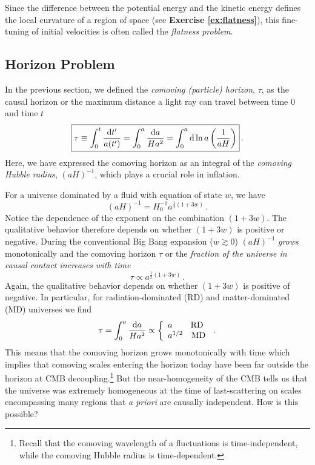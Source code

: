 \documentclass[12pt,letterpaper,rotate]{article}
\def\beq{\begin{equation}}
\def\eeq{\end{equation}}
\def\d{{\rm d}}
\begin{document}
{\begin{itemize}
Since the difference between the potential energy and the kinetic energy defines the local curvature of a region of space (see {\bf Exercise \ref{ex:flatness}}), this fine-tuning of initial velocities is often called the
{\it flatness problem}.

\end{itemize}

\subsection{Horizon Problem}
\label{sec:horizon}

In the previous section,
we defined the
{\it comoving (particle) horizon}, $\tau$, as the causal horizon or the maximum distance a light ray can travel between time $0$ and time $t$
\beq
\fbox{$\displaystyle
\tau \equiv \int_0^t \frac{\d t'}{a(t')} = \int_0^a \frac{\d a}{Ha^2} = \int_0^a \d \ln a \left(\frac{1}{aH}\right)$}\, .
\eeq
Here, we have expressed the comoving horizon as an integral of the {\it comoving Hubble radius}, $(aH)^{-1}$, which plays a crucial role in inflation. 

For a universe dominated by a fluid with equation of state $w$, we have
\beq
(aH)^{-1} = H_0^{-1} a^{\frac{1}{2}(1+3w)}\, .
\eeq 
Notice the dependence of the exponent on the combination $(1+3w)$.
The qualitative behavior therefore depends on whether $(1+ 3 w)$ is positive or negative.
During the conventional Big Bang expansion ($w \gtrsim 0$) $(a H)^{-1}$ {\it grows} monotonically  
and the comoving horizon $\tau$ or the {\it fraction of the universe in causal contact increases with time}
\beq
\tau \propto a^{\frac{1}{2}(1+ 3 w)}\, .
\eeq
Again, the qualitative behavior depends on whether $(1+3w)$ is positive of negative.
In particular, for radiation-dominated (RD) and matter-dominated (MD) universes we find
\beq
\tau = \int_0^a \frac{\d a}{Ha^2} \propto
\left\{ 
\begin{array}{ll}
a \quad \quad \,\rm{RD}\\
a^{1/2} \quad \rm{MD}
\end{array} \right.  \, . 
\eeq
This means that the comoving horizon grows monotonically with time which implies that comoving scales entering the horizon today have been far outside the horizon at CMB decoupling.\footnote{Recall that the comoving wavelength of a fluctuations is time-independent, while the comoving Hubble radius is time-dependent.}
But the near-homogeneity of the CMB tells us that the universe was extremely homogeneous 
at the time of last-scattering on scales encompassing 
 many regions that {\it a priori} are causally independent.
How is this possible? 

}
\end{document}
